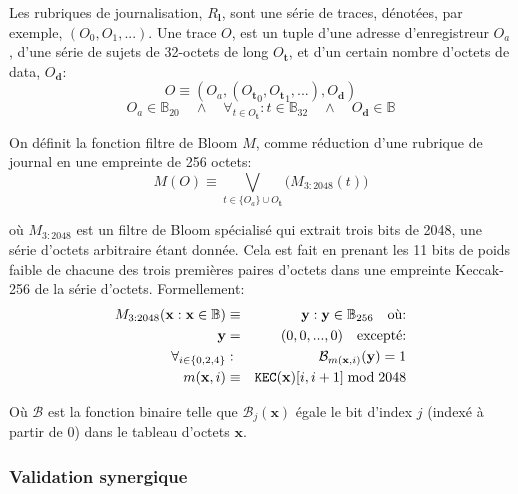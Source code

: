 \documentclass[9pt,oneside]{amsart}
\begin{document}
\begin{multicols}{2}
Les rubriques de journalisation, $R_\mathbf{l}$, sont une série de traces, dénotées, par exemple, $(O_0, O_1, ...)$. Une trace $O$, est un tuple d'une adresse d'enregistreur $O_a$, d'une série de sujets de 32-octets de long $O_\mathbf{t}$, et d'un certain nombre d'octets de data, $O_\mathbf{d}$:
\begin{equation}
O \equiv (O_a, ({O_\mathbf{t}}_0, {O_\mathbf{t}}_1, ...), O_\mathbf{d})
\end{equation}
\begin{equation}
O_a \in \mathbb{B}_{20} \quad \wedge \quad \forall_{t \in O_\mathbf{t}}: t \in \mathbb{B}_{32} \quad \wedge \quad O_\mathbf{d} \in \mathbb{B}
\end{equation}

On définit la fonction filtre de Bloom $M$, comme réduction d'une rubrique de journal en une empreinte de 256 octets:
\begin{equation}
M(O) \equiv \bigvee_{t \in \{O_a\} \cup O_\mathbf{t}} \big( M_{3:2048}(t) \big)
\end{equation}

où $M_{3:2048}$ est un filtre de Bloom spécialisé qui extrait trois bits de 2048, une série d'octets arbitraire étant donnée. Cela est fait en prenant les 11 bits de poids faible de chacune des trois premières paires d'octets dans une empreinte Keccak-256 de la série d'octets. Formellement:
\begin{eqnarray}
M_{3:2048}(\mathbf{x}: \mathbf{x} \in \mathbb{B}) & \equiv & \mathbf{y}: \mathbf{y} \in \mathbb{B}_{256} \quad \text{où:}\\
\mathbf{y} & = & (0, 0, ..., 0) \quad \text{excepté:}\\
\forall_{i \in \{0, 2, 4\}}&:& \mathcal{B}_{m(\mathbf{x}, i)}(\mathbf{y}) = 1\\
m(\mathbf{x}, i) &\equiv& \mathtt{\tiny KEC}(\mathbf{x})[i, i + 1] \bmod 2048
\end{eqnarray}

Où $\mathcal{B}$ est la fonction binaire telle que $\mathcal{B}_j(\mathbf{x})$ égale le bit d'index $j$ (indexé à partir de 0) dans le tableau d'octets $\mathbf{x}$.

\subsubsection{Validation synergique}


\end{multicols}
\end{document}
